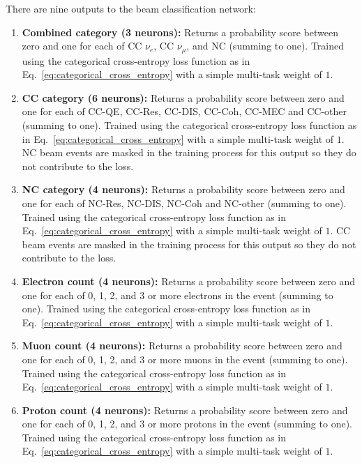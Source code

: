 There are nine outputs to the beam classification network:
\begin{enumerate}
    \item \textbf{Combined category (3 neurons):} Returns a probability score between zero and one
          for each of CC $\nu_{e}$, CC $\nu_{\mu}$, and NC (summing to one). Trained using the
          categorical cross-entropy loss function as in Eq.~\ref{eq:categorical_cross_entropy}
          with a simple multi-task weight of $1$.
    \item \textbf{CC category (6 neurons):} Returns a probability score between zero and one for
          each of CC-QE, CC-Res, CC-DIS, CC-Coh, CC-MEC and CC-other (summing to one). Trained
          using the categorical cross-entropy loss function as in
          Eq.~\ref{eq:categorical_cross_entropy} with a simple multi-task weight of $1$. NC beam
          events are masked in the training process for this output so they do not contribute to
          the loss.
    \item \textbf{NC category (4 neurons):} Returns a probability score between zero and one for
          each of NC-Res, NC-DIS, NC-Coh and NC-other (summing to one). Trained using the
          categorical cross-entropy loss function as in Eq.~\ref{eq:categorical_cross_entropy}
          with a simple multi-task weight of $1$. CC beam events are masked in the training
          process for this output so they do not contribute to the loss.
    \item \textbf{Electron count (4 neurons):} Returns a probability score between zero and one
          for each of 0, 1, 2, and 3 or more electrons in the event (summing to one). Trained
          using the categorical cross-entropy loss function as in
          Eq.~\ref{eq:categorical_cross_entropy} with a simple multi-task weight of $1$.
    \item \textbf{Muon count (4 neurons):} Returns a probability score between zero and one for
          each of 0, 1, 2, and 3 or more muons in the event (summing to one). Trained using the
          categorical cross-entropy loss function as in Eq.~\ref{eq:categorical_cross_entropy}
          with a simple multi-task weight of $1$.
    \item \textbf{Proton count (4 neurons):} Returns a probability score between zero and one for
          each of 0, 1, 2, and 3 or more protons in the event (summing to one). Trained using the
          categorical cross-entropy loss function as in Eq.~\ref{eq:categorical_cross_entropy}
          with a simple multi-task weight of $1$.

\end{enumerate}
